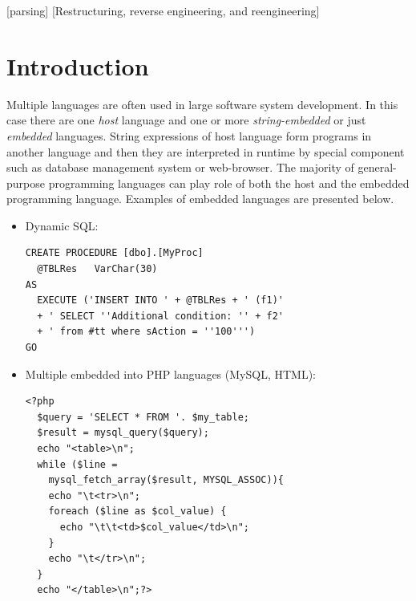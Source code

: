 \documentclass{acm_proc_article-sp}
\begin{document}
[parsing]
[Restructuring, reverse engineering, and reengineering]




\section{Introduction}

Multiple languages are often used in large software system development. In this case there are one {\it host} language and one or more {\it string-embedded} or just {\it embedded} languages. String expressions of host language form programs in another language and then they are interpreted in runtime by special component such as database management system or web-browser. The majority of general-purpose programming languages can play role of both the host and the embedded programming language. Examples of embedded languages are presented below.

\begin{itemize}

\!
\item Dynamic SQL:
\!
\begin{verbatim}
CREATE PROCEDURE [dbo].[MyProc] 
  @TBLRes   VarChar(30)
AS
  EXECUTE ('INSERT INTO ' + @TBLRes + ' (f1)'
  + ' SELECT ''Additional condition: '' + f2'
  + ' from #tt where sAction = ''100''')
GO
\end{verbatim}

\item Multiple embedded into PHP languages (MySQL, HTML):

\begin{verbatim}
<?php
  $query = 'SELECT * FROM '. $my_table;
  $result = mysql_query($query);  
  echo "<table>\n";
  while ($line = 
    mysql_fetch_array($result, MYSQL_ASSOC)){
    echo "\t<tr>\n";
    foreach ($line as $col_value) {
      echo "\t\t<td>$col_value</td>\n";
    }
    echo "\t</tr>\n";
  }
  echo "</table>\n";?> 
\end{verbatim}

\end{itemize}
\end{document}
